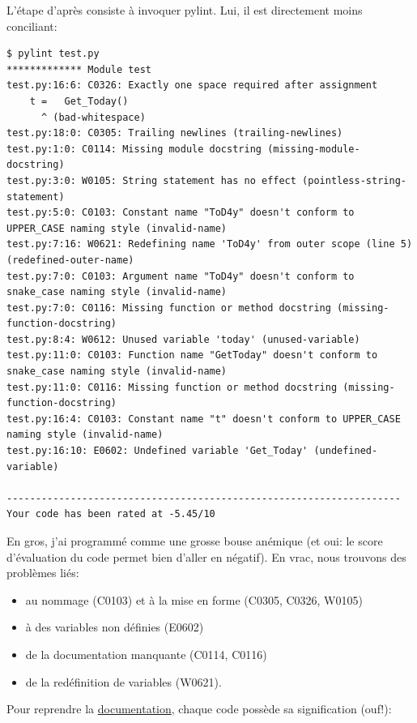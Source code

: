 \documentclass[11pt]{amsbook}
\begin{document}
L’étape d’après consiste à invoquer pylint.
Lui, il est directement moins conciliant:


\begin{verbatim}
$ pylint test.py
************* Module test
test.py:16:6: C0326: Exactly one space required after assignment
    t =   Get_Today()
      ^ (bad-whitespace)
test.py:18:0: C0305: Trailing newlines (trailing-newlines)
test.py:1:0: C0114: Missing module docstring (missing-module-docstring)
test.py:3:0: W0105: String statement has no effect (pointless-string-statement)
test.py:5:0: C0103: Constant name "ToD4y" doesn't conform to UPPER_CASE naming style (invalid-name)
test.py:7:16: W0621: Redefining name 'ToD4y' from outer scope (line 5) (redefined-outer-name)
test.py:7:0: C0103: Argument name "ToD4y" doesn't conform to snake_case naming style (invalid-name)
test.py:7:0: C0116: Missing function or method docstring (missing-function-docstring)
test.py:8:4: W0612: Unused variable 'today' (unused-variable)
test.py:11:0: C0103: Function name "GetToday" doesn't conform to snake_case naming style (invalid-name)
test.py:11:0: C0116: Missing function or method docstring (missing-function-docstring)
test.py:16:4: C0103: Constant name "t" doesn't conform to UPPER_CASE naming style (invalid-name)
test.py:16:10: E0602: Undefined variable 'Get_Today' (undefined-variable)

--------------------------------------------------------------------
Your code has been rated at -5.45/10
\end{verbatim}

En gros, j’ai programmé comme une grosse bouse anémique (et oui: le score d’évaluation du code permet bien d’aller en négatif).
En vrac, nous trouvons des problèmes liés:


\begin{itemize}

\item au nommage (C0103) et à la mise en forme (C0305, C0326, W0105)

\item à des variables non définies (E0602)

\item de la documentation manquante (C0114, C0116)

\item de la redéfinition de variables (W0621).

\end{itemize}


Pour reprendre la \href{http://pylint.pycqa.org/en/latest/user_guide/message-control.html}{documentation}, chaque code possède sa signification (ouf!):
\end{document}
